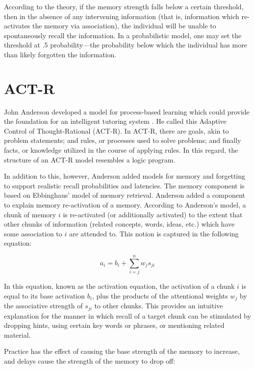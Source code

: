 According to the theory, if the memory strength falls below a certain
threshold, then in the absence of any intervening information (that is,
information which re-activates the memory via association), the individual will
be unable to spontaneously recall the information.  In a probabilistic model,
one may set the threshold at .5 probability---the probability below which the
individual has more than likely forgotten the information. 

\section{ACT-R}

John Anderson developed a model for process-based learning which could provide
the foundation for an intelligent tutoring system \cite{anderson}.  He called
this Adaptive Control of Thought-Rational (ACT-R).  In ACT-R, there are goals,
akin to problem statements; and rules, or processes used to solve problems; and
finally facts, or knowledge utilized in the course of applying rules.  In this
regard, the structure of an ACT-R model resembles a logic program.  

In addition to this, however, Anderson added models for memory and forgetting
to support realistic recall probabilities and latencies.  The memory component
is based on Ebbinghaus' model of memory retrieval.  Anderson added a component
to explain memory re-activation of a memory.  According to Anderson's model, a
chunk of memory $i$ is re-activated (or additionally activated) to the extent
that other chunks of information (related concepts, words, ideas, etc.) which
have some association to $i$ are attended to.  This notion is captured in the
following equation:

\begin{equation}
\label{eq:anderson}
a_i = b_i + \displaystyle\sum_{i=j}^n w_j s_{ji}
\end{equation}

In this equation, known as the activation equation, the activation of a chunk
$i$ is equal to its base activation $b_i$, plus the products of the attentional
weights $w_j$ by the associative strength of $s_{ji}$ to other chunks.  This
provides an intuitive explanation for the manner in which recall of a target
chunk can be stimulated by dropping hints, using certain key words or phrases,
or mentioning related material. 

Practice has the effect of causing the base strength of the memory to increase,
and delays cause the strength of the memory to drop off:  

